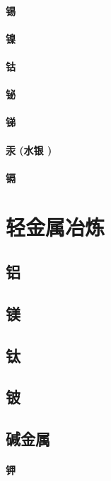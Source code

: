\documentclass[UTF8]{../../ApplicationUniverse}
\begin{document}
\subsubsection{锡}
\subsubsection{镍}
\subsubsection{钴}
\subsubsection{铋}
\subsubsection{锑}
\subsubsection{汞 (水银 )}
\subsubsection{镉}










\chapter{轻金属冶炼}
\section{铝}
\section{镁}
\section{钛}
\section{铍}
\section{碱金属}
    \subsubsection{钾}
\end{document}
